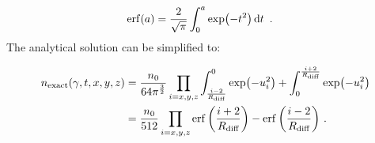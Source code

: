 \begin{equation}
    \begin{aligned}
    \erf(a)&= \frac{2}{\sqrt{\pi}}\int_{0}^{a}\exp(-t^2)\dd{t}\text{ .} 
    \end{aligned}
\end{equation}
\noindent The analytical solution can be simplified to:

\begin{equation}
	\begin{aligned}
		n_\text{exact}\qty(\gamma,t,x,y,z)&=\frac{n_0}{64\pi^{\frac{3}{2}}}\prod_{i=x,y,z}\int_{\frac{i-2}{R_\text{diff}}}^0\exp(-u_i^2) + \int_{0}^{\frac{i+2}{R_\text{diff}}}\exp(-u_i^2) \\
		&=\frac{n_0}{512} \prod_{i=x,y,z} \erf\qty(\frac{i+2}{R_\text{diff}})-\erf\qty(\frac{i-2}{R_\text{diff}})\text{ .} 
	\end{aligned} \label{eq:chapter_9_multizone_diff_exact_sol}
\end{equation} 

